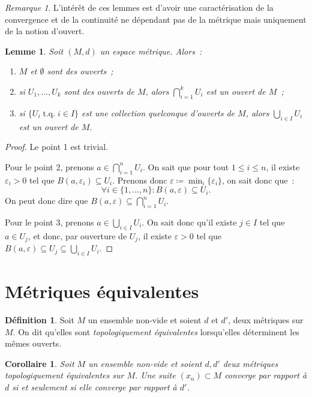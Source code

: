 \documentclass{report}
\newtheorem{lem}[thm]{Lemme}
\newtheorem{cor}[thm]{Corollaire}
\theoremstyle{definition}
\newtheorem{déf}[thm]{Définition}
\theoremstyle{remark}
\newtheorem*{rmq}{Remarque}
\DeclareMathOperator{\tq}{\text{ t.q. }}
\begin{document}
		\begin{rmq} L'intérêt de ces lemmes est d'avoir une caractérisation de la convergence et de la continuité ne dépendant pas de la métrique mais uniquement
		de la notion d'ouvert.
		\end{rmq}
		
		\begin{lem}\label{lem:espmetraxiomestop} Soit $(M, d)$ un espace métrique. Alors~:
		\begin{enumerate}
			\item $M$ et $\emptyset$ sont des ouverts~;
			\item si $U_1, \ldots, U_k$ sont des ouverts de $M$, alors $\bigcap_{i=1}^kU_i$ est un ouvert de $M$~;
			\item si $\{U_i \tq i \in I\}$ est une collection quelconque d'ouverts de $M$, alors $\bigcup_{i\in I}U_i$ est un ouvert de $M$.
		\end{enumerate}
		\end{lem}
		
		\begin{proof} Le point 1 est trivial.
		
		Pour le point 2, prenons $a \in \bigcap_{i=1}^nU_i$. On sait que pour tout $1 \leq i \leq n$, il existe $\varepsilon_i > 0$ tel que
		$B(a, \varepsilon_i) \subseteq U_i$. Prenons donc $\varepsilon \coloneqq \min_i\{\varepsilon_i\}$, on sait donc que~:
		\[\forall i \in \{1, \ldots, n\} : B(a, \varepsilon) \subseteq U_i.\]
		On peut donc dire que $B(a, \varepsilon) \subseteq \bigcap_{i=1}^nU_i$.
		
		Pour le point 3, prenons $a \in \bigcup_{i\in I}U_i$. On sait donc qu'il existe $j \in I$ tel que $a \in U_j$, et donc, par ouverture de $U_j$, il existe
		$\varepsilon > 0$ tel que $B(a, \varepsilon) \subseteq U_j \subseteq \bigcup_{i\in I}U_i$.
		\end{proof}
		
	\section{Métriques équivalentes}
		\begin{déf} Soit $M$ un ensemble non-vide et soient $d$ et $d'$, deux métriques sur $M$. On dit qu'elles sont \textit{topologiquement équivalentes} lorsqu'elles
		déterminent les mêmes ouverts.
		\end{déf}
		
		\begin{cor} Soit $M$ un ensemble non-vide et soient $d, d'$ deux métriques topologiquement équivalentes sur $M$. Une suite $(x_n) \subset M$ converge par
		rapport à $d$ si et seulement si elle converge par rapport à $d'$.
		\end{cor}
		
\end{document}
